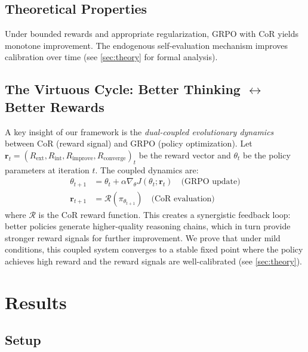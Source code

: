 \documentclass{article}
\theoremstyle{plain}
\theoremstyle{definition}
\theoremstyle{remark}
\begin{document}
\subsection{Theoretical Properties}

Under bounded rewards and appropriate regularization, GRPO with CoR yields monotone improvement. The endogenous self-evaluation mechanism improves calibration over time (see \autoref{sec:theory} for formal analysis).

\subsection{The Virtuous Cycle: Better Thinking $\leftrightarrow$ Better Rewards}

A key insight of our framework is the \textit{dual-coupled evolutionary dynamics} between CoR (reward signal) and GRPO (policy optimization). Let $\mathbf{r}_t = (R_{\text{ext}}, R_{\text{int}}, R_{\text{improve}}, R_{\text{converge}})_t$ be the reward vector and $\theta_t$ be the policy parameters at iteration $t$. The coupled dynamics are:
\begin{align}
\theta_{t+1} &= \theta_t + \alpha \nabla_\theta J(\theta_t; \mathbf{r}_t) \quad \text{(GRPO update)} \\
\mathbf{r}_{t+1} &= \mathcal{R}(\pi_{\theta_{t+1}}) \quad \text{(CoR evaluation)}
\end{align}
where $\mathcal{R}$ is the CoR reward function. This creates a synergistic feedback loop: better policies generate higher-quality reasoning chains, which in turn provide stronger reward signals for further improvement. We prove that under mild conditions, this coupled system converges to a stable fixed point where the policy achieves high reward and the reward signals are well-calibrated (see \autoref{sec:theory}).

\section{Results}
\label{sec:results}


\subsection{Setup}
\end{document}
